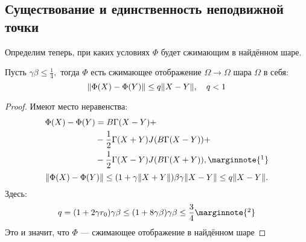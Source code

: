 \subsection{Существование и единственность неподвижной точки}
Определим теперь, при каких условиях \( \Phi \) будет сжимающим в найдённом шаре.
\begin{lemma}
    Пусть \( \gamma\beta \leq \frac14, \)
    тогда \( \Phi \) есть сжимающее отображение \(\Omega\to\Omega\) шара \(\Omega\) в себя:
    \[ {\left\|{\Phi(X)-\Phi(Y)}\right\|} \leq q {\left\|{X-Y}\right\|}, \quad q<1\]
\end{lemma}
\begin{proof}
    Имеют место неравенства:
    \begin{align*}
        \Phi(X) - \Phi(Y) &= B\Gamma (X-Y) + \\
        &- \frac12 \Gamma (X + Y)J(B\Gamma(X - Y)) + \\
        &- \frac12 \Gamma (X - Y)J(B\Gamma(X + Y)),
        \marginnote{\footnotemark}
    \end{align*}
    \[
        {\left\|{\Phi(X) - \Phi(Y)}\right\|} \leq (1 + \gamma{\left\|{X+Y}\right\|})\beta\gamma {\left\|{X-Y}\right\|} \leq q{\left\|{X-Y}\right\|}.
        \]
    Здесь:
    \begin{equation}\label{eq:lipconst}
        q = (1+2\gamma r_0)\gamma\beta
        \leq (1+8\gamma\beta)\gamma\beta \leq \frac{3}{4}
        \marginnote{\footnotemark}
    \end{equation}
    Это и значит, что \( \Phi \) --- сжимающее отображение в найдённом шаре
\end{proof}

